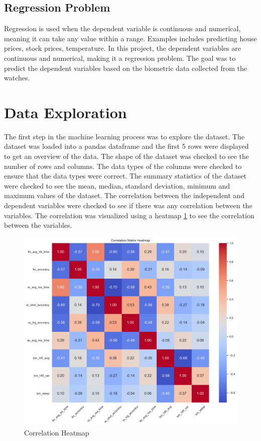 \subsection*{Regression Problem}
Regression is used when the dependent variable is continuous and numerical, meaning it can take any value within a range. Examples includes predicting house prices, stock prices, 
temperature. In this project, the dependent variables are continuous and numerical, making it a regression problem. The goal was to predict the dependent variables based on the biometric
data collected from the watches. 

\section{Data Exploration}
The first step in the machine learning process was to explore the dataset. The dataset was loaded into a pandas dataframe and the first 5 rows were displayed to get an overview of the
data. The shape of the dataset was checked to see the number of rows and columns. The data types of the columns were checked to ensure that the data types were correct. The summary
statistics of the dataset were checked to see the mean, median, standard deviation, minimum and maximum values of the dataset. The correlation between the independent and dependent
variables were checked to see if there was any correlation between the variables. The correlation was visualized using a heatmap \ref{fig:correlation_heatmap} to see the correlation 
between the variables.

\begin{figure}[H]
    \centering
    \includegraphics[width=1\textwidth]{images/correlation.png}
    \caption{Correlation Heatmap}
    \label{fig:correlation_heatmap}
\end{figure}


